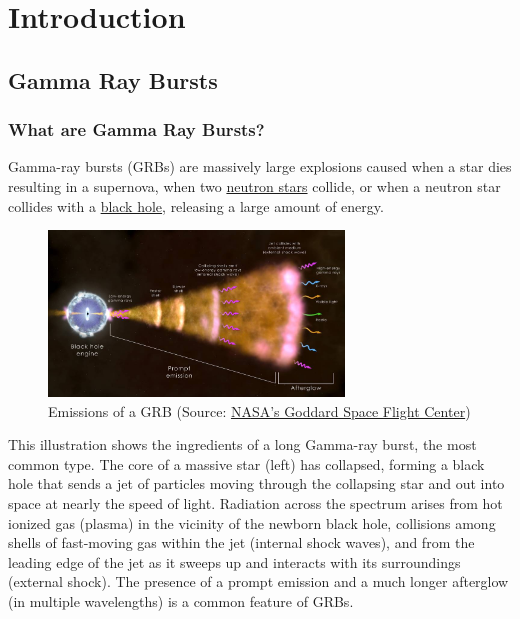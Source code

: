 \documentclass[11pt]{book} %
\begin{document}

\chapter{Introduction}
\section{Gamma Ray Bursts}
\subsection{What are Gamma Ray Bursts?}
Gamma-ray bursts (GRBs) are massively large explosions caused when a star dies resulting in a supernova, when two \href{https://en.wikipedia.org/wiki/Neutron_star}{neutron stars} collide, or when a neutron star collides with a \href{https://en.wikipedia.org/wiki/Black_hole}{black hole}, releasing a large amount of energy.  

\begin{figure}[H]
\centering
    \includegraphics[width=0.7\textwidth]{Pictures/grb_shell_final_0.jpg}
    \caption{Emissions of a GRB (Source: \href{https://www.nasa.gov/feature/goddard/2023/nasa-missions-study-what-may-be-a-1-in-10000-year-Gamma-ray-burst}{NASA's Goddard Space Flight Center})}
\end{figure}

This illustration shows the ingredients of a long Gamma-ray burst, the most common type. The core of a massive star (left) has collapsed, forming a black hole that sends a jet of particles moving through the collapsing star and out into space at nearly the speed of light. Radiation across the spectrum arises from hot ionized gas (plasma) in the vicinity of the newborn black hole, collisions among shells of fast-moving gas within the jet (internal shock waves), and from the leading edge of the jet as it sweeps up and interacts with its surroundings (external shock). The presence of a prompt emission and a much longer afterglow (in multiple wavelengths) is a common feature of GRBs.
\end{document}
